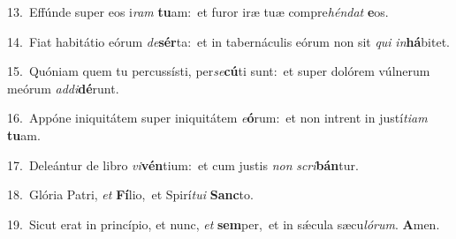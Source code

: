 {\numbfont\textcolor{\numbcolor}{13.}}~Effúnde super eos i\textit{ram} \textbf{tu}\-am:~\star et furor iræ tuæ compre\-\textit{hén}\-\textit{dat} \textbf{e}\-os.\par
{\numbfont\textcolor{\numbcolor}{14.}}~Fiat habitátio eórum \textit{de}\-\textbf{sér}ta:~\star et in tabernáculis eórum non sit \textit{qui} \textit{in}\-\textbf{há}bitet.\par
{\numbfont\textcolor{\numbcolor}{15.}}~Quóniam quem tu percussísti, per\-\textit{se}\-\textbf{cú}ti sunt:~\star et super dolórem vúlnerum meórum \textit{ad}\-\textit{di}\textbf{dé}runt.\par
{\numbfont\textcolor{\numbcolor}{16.}}~Appóne iniquitátem super iniquitátem \textit{e}\-\textbf{ó}rum:~\star et non intrent in justí\-\textit{ti}\-\textit{am} \textbf{tu}\-am.\par
{\numbfont\textcolor{\numbcolor}{17.}}~Deleántur de libro \textit{vi}\-\textbf{vén}tium:~\star et cum justis \textit{non} \textit{scri}\-\textbf{bán}tur.\par
{\numbfont\textcolor{\numbcolor}{18.}}~Glória Patri, \textit{et} \textbf{Fí}\-lio,~\star et Spirí\-\textit{tu}\-\textit{i} \textbf{Sanc}\-to.\par
{\numbfont\textcolor{\numbcolor}{19.}}~Sicut erat in princípio, et nunc, \textit{et} \textbf{sem}\-per,~\star et in sǽcula sæcu\-\textit{ló}\-\textit{rum}. \textbf{A}\-men.\par
